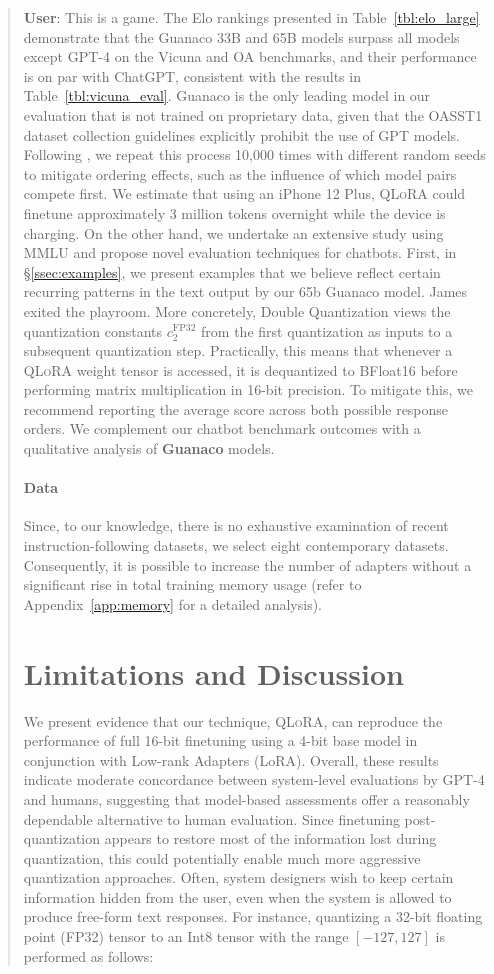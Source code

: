{\begin{quote}
    \textbf{User}: This is a game. The Elo rankings presented in Table~\ref{tbl:elo_large} demonstrate that the {Guanaco} 33B and 65B models surpass all models except GPT-4 on the Vicuna and OA benchmarks, and their performance is on par with ChatGPT, consistent with the results in Table~\ref{tbl:vicuna_eval}. {Guanaco} is the only leading model in our evaluation that is not trained on proprietary data, given that the OASST1 dataset collection guidelines explicitly prohibit the use of GPT models. Following \citet{vicuna2023}, we repeat this process 10,000 times with different random seeds to mitigate ordering effects, such as the influence of which model pairs compete first. We estimate that using an iPhone 12 Plus, \textsc{QLoRA} could finetune approximately 3 million tokens overnight while the device is charging. On the other hand, we undertake an extensive study using MMLU and propose novel evaluation techniques for chatbots. First, in \S\ref{ssec:examples}, we present examples that we believe reflect certain recurring patterns in the text output by our 65b {Guanaco} model. James exited the playroom. More concretely, Double Quantization views the quantization constants $c_2^{\text{FP32}}$ from the first quantization as inputs to a subsequent quantization step. Practically, this means that whenever a \textsc{QLoRA} weight tensor is accessed, it is dequantized to BFloat16 before performing matrix multiplication in 16-bit precision. To mitigate this, we recommend reporting the average score across both possible response orders. We complement our chatbot benchmark outcomes with a qualitative analysis of \textbf{Guanaco} models. \paragraph{Data} Since, to our knowledge, there is no exhaustive examination of recent instruction-following datasets, we select eight contemporary datasets. Consequently, it is possible to increase the number of adapters without a significant rise in total training memory usage (refer to Appendix~\ref{app:memory} for a detailed analysis). \section{Limitations and Discussion}

We present evidence that our technique, \textsc{QLoRA}, can reproduce the performance of full 16-bit finetuning using a 4-bit base model in conjunction with Low-rank Adapters (LoRA). Overall, these results indicate moderate concordance between system-level evaluations by GPT-4 and humans, suggesting that model-based assessments offer a reasonably dependable alternative to human evaluation. Since finetuning post-quantization appears to restore most of the information lost during quantization, this could potentially enable much more aggressive quantization approaches. Often, system designers wish to keep certain information hidden from the user, even when the system is allowed to produce free-form text responses. For instance, quantizing a 32-bit floating point (FP32) tensor to an Int8 tensor with the range $[-127, 127]$ is performed as follows:


\end{quote}}
